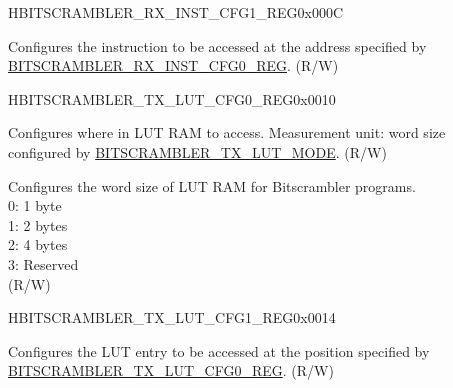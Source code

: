 \begin{register}{H}{BITSCRAMBLER\_RX\_INST\_CFG1\_REG}{0x000C}\label{regdesc:BITSCRAMBLERRXINSTCFG1REG}
%
\regnewline%
\begin{regdesc}\begin{reglist}
\label{fielddesc:BITSCRAMBLERRXINST}\item [BITSCRAMBLER\_RX\_INST] Configures the instruction to be accessed at the address specified by \hyperref[regdesc:BITSCRAMBLERRXINSTCFG0REG]{BITSCRAMBLER\_RX\_INST\_CFG0\_REG}. (R/W)
\end{reglist}\end{regdesc}
\end{register}


\begin{register}{H}{BITSCRAMBLER\_TX\_LUT\_CFG0\_REG}{0x0010}\label{regdesc:BITSCRAMBLERTXLUTCFG0REG}
%
%
%
\regnewline%
\begin{regdesc}\begin{reglist}
\label{fielddesc:BITSCRAMBLERTXLUTIDX}\item [BITSCRAMBLER\_TX\_LUT\_IDX] Configures where in LUT RAM to access. Measurement unit: word size configured by \hyperref[fielddesc:BITSCRAMBLERTXLUTMODE]{BITSCRAMBLER\_TX\_LUT\_MODE}. (R/W)
\label{fielddesc:BITSCRAMBLERTXLUTMODE}\item [BITSCRAMBLER\_TX\_LUT\_MODE] Configures the word size of LUT RAM for Bitscrambler programs. \\
0: 1 byte\\
1: 2 bytes\\
2: 4 bytes\\ 
3: Reserved\\
(R/W)
\end{reglist}\end{regdesc}
\end{register}


\begin{register}{H}{BITSCRAMBLER\_TX\_LUT\_CFG1\_REG}{0x0014}\label{regdesc:BITSCRAMBLERTXLUTCFG1REG}
%
\regnewline%
\begin{regdesc}\begin{reglist}
\label{fielddesc:BITSCRAMBLERTXLUT}\item [BITSCRAMBLER\_TX\_LUT] Configures the LUT entry to be accessed at the position specified by \hyperref[regdesc:BITSCRAMBLERTXLUTCFG0REG]{BITSCRAMBLER\_TX\_LUT\_CFG0\_REG}. (R/W)
\end{reglist}\end{regdesc}
\end{register}


